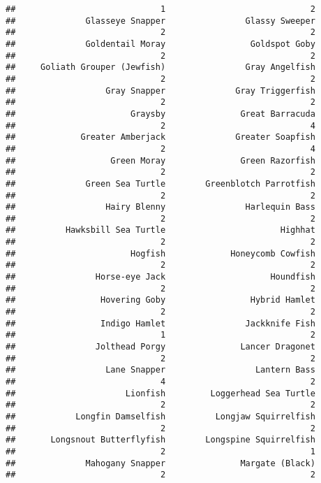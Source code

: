 \documentclass[
]{article}
\begin{document}
\begin{verbatim}
##                             1                             2 
##              Glasseye Snapper                Glassy Sweeper 
##                             2                             2 
##              Goldentail Moray                 Goldspot Goby 
##                             2                             2 
##     Goliath Grouper (Jewfish)                Gray Angelfish 
##                             2                             2 
##                  Gray Snapper              Gray Triggerfish 
##                             2                             2 
##                       Graysby               Great Barracuda 
##                             2                             4 
##             Greater Amberjack              Greater Soapfish 
##                             2                             4 
##                   Green Moray               Green Razorfish 
##                             2                             2 
##              Green Sea Turtle        Greenblotch Parrotfish 
##                             2                             2 
##                  Hairy Blenny                Harlequin Bass 
##                             2                             2 
##          Hawksbill Sea Turtle                       Highhat 
##                             2                             2 
##                       Hogfish             Honeycomb Cowfish 
##                             2                             2 
##                Horse-eye Jack                     Houndfish 
##                             2                             2 
##                 Hovering Goby                 Hybrid Hamlet 
##                             2                             2 
##                 Indigo Hamlet                Jackknife Fish 
##                             1                             2 
##                Jolthead Porgy               Lancer Dragonet 
##                             2                             2 
##                  Lane Snapper                  Lantern Bass 
##                             4                             2 
##                      Lionfish         Loggerhead Sea Turtle 
##                             2                             2 
##            Longfin Damselfish          Longjaw Squirrelfish 
##                             2                             2 
##       Longsnout Butterflyfish        Longspine Squirrelfish 
##                             2                             1 
##              Mahogany Snapper               Margate (Black) 
##                             2                             2 

\end{verbatim}
\end{document}
